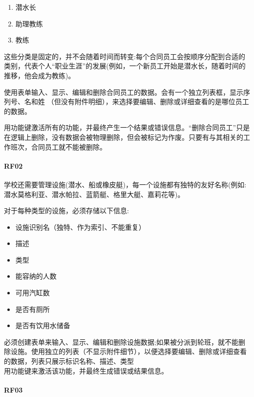 \begin{enumerate}
\tightlist
\item
  潜水长
\item
  助理教练
\item
  教练
\end{enumerate}

这些分类是固定的，并不会随着时间而转变:每个合同员工会按顺序分配到合适的类别，代表个人``职业生涯''的发展(例如，一个新员工开始是潜水长，随着时间的推移，他会成为教练)。

使用表单输入、显示、编辑和删除合同员工的数据。会有一个独立列表框，显示序列号、名和姓
（但没有附件明细），来选择要编辑、删除或详细查看的是哪位员工的数据。

用功能键激活所有的功能，并最终产生一个结果或错误信息。``删除合同员工''只是在逻辑上删除，没有数据会被物理删除，但会被标记为作废。只要有与其相关的工作班次，合同员工就不能被删除。

\hypertarget{rf02}{%
\paragraph{RF02}\label{rf02}}

学校还需要管理设施(潜水、船或橡皮艇)，每一个设施都有独特的友好名称(例如:潜水莫格利亚、潜水帕拉、蓝箭艇、格里大艇、嘉莉花等)。

对于每种类型的设施，必须存储以下信息:

\begin{itemize}
\tightlist
\item
  设施识别名（独特、作为索引、不能重复）
\item
  描述
\item
  类型
\item
  能容纳的人数
\item
  可用汽缸数
\item
  是否有厕所
\item
  是否有饮用水储备
\end{itemize}

必须创建表单来输入、显示、编辑和删除设施数据;如果被分派到轮班，就不能删除设施。使用独立的列表（不显示附件细节），以便选择要编辑、删除或详细查看的数据，列表只展示标识名称、描述、类型\\
用功能键来激活该功能，并最终生成错误或结果信息。

\hypertarget{rf03}{%
\paragraph{RF03}\label{rf03}}

